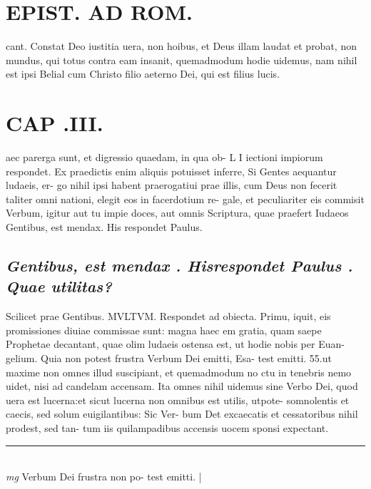 \documentclass{article}
\begin{document}
\begin{pages}
\section*{EPIST. AD ROM.  }
\marginpar{[ p.24 ]}\pstart cant. Constat Deo iustitia uera, non hoibus, et Deus illam laudat et probat, non mundus, qui totus contra eam insanit, quemadmodum hodie uidemus, nam nihil est ipsi Belial cum Christo filio aeterno Dei, qui est filius lucis.   \pend
\endnumbering\beginnumbering\section{CAP .III.}\pstart aec parerga sunt, et digressio quaedam, in qua ob- L I iectioni impiorum respondet. Ex praedictis enim aliquis potuisset inferre, Si Gentes aequantur ludaeis, er- go nihil ipsi habent praerogatiui prae illis, cum Deus non fecerit taliter omni nationi, elegit eos in facerdotium re- gale, et peculiariter eis commisit Verbum, igitur aut tu impie doces, aut omnis Scriptura, quae praefert Iudaeos Gentibus, est mendax. His respondet Paulus.   \pend
{}
{}
\subsection*{\textit{\huge\textbf{Gentibus, est mendax . Hisrespondet Paulus . }\normalsize Quae utilitas? }}\pstart Scilicet prae Gentibus. MVLTVM. Respondet ad obiecta. Primu, iquit, eis promissiones diuiae commissae sunt: magna haec em gratia, quam saepe Prophetae decantant, quae olim ludaeis ostensa est, ut hodie nobis per Euan- gelium. Quia non potest frustra Verbum Dei emitti, Esa- test emitti.  55.ut maxime non omnes illud suscipiant, et quemadmodum no ctu in tenebris nemo uidet, nisi ad candelam accensam.  Ita omnes nihil uidemus sine Verbo Dei, quod uera est lucerna:et sicut lucerna non omnibus est utilis, utpote- somnolentis et caecis, sed solum euigilantibus: Sic Ver- bum Det excaecatis et cessatoribus nihil prodest, sed tan- tum iis quilampadibus accensis uocem sponsi expectant.   \pend
\vspace{0.5cm}\noindent
\vspace{0.2cm}\rule{1cm}{0.2pt}\\ 
\hspace{0.2cm}\textit{mg}
\footnotesize Verbum Dei frustra non po- test emitti.  
\normalsize| 

\end{pages}
\end{document}
